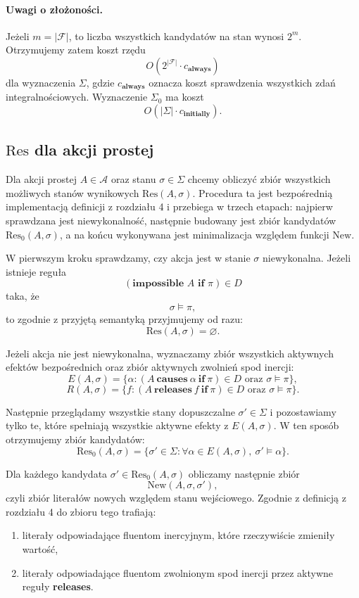 \documentclass[11pt,a4paper]{article}
\theoremstyle{definition}
\begin{document}
\paragraph{Uwagi o złożoności.}
Jeżeli $m = |\mathcal{F}|$, to liczba wszystkich kandydatów na stan wynosi $2^m$. Otrzymujemy zatem koszt rzędu
\[
O(2^{|\mathcal{F}|} \cdot c_{\textbf{always}})
\]
dla wyznaczenia $\Sigma$, gdzie $c_{\textbf{always}}$ oznacza koszt sprawdzenia wszystkich zdań integralnościowych. Wyznaczenie $\Sigma_0$ ma koszt
\[
O(|\Sigma| \cdot c_{\textbf{initially}}).
\]

\subsection{\texorpdfstring{$\mathrm{Res}$}{Res} dla akcji prostej}

Dla akcji prostej $A \in \mathcal{A}$ oraz stanu $\sigma \in \Sigma$ chcemy obliczyć zbiór wszystkich możliwych stanów wynikowych $\mathrm{Res}(A,\sigma)$. Procedura ta jest bezpośrednią implementacją definicji z rozdziału 4 i przebiega w trzech etapach: najpierw sprawdzana jest niewykonalność, następnie budowany jest zbiór kandydatów $\mathrm{Res}_0(A,\sigma)$, a na końcu wykonywana jest minimalizacja względem funkcji $\mathrm{New}$.

W pierwszym kroku sprawdzamy, czy akcja jest w stanie $\sigma$ niewykonalna. Jeżeli istnieje reguła
\[
(\textbf{impossible } A \textbf{ if } \pi)\in D
\]
taka, że
\[
\sigma \models \pi,
\]
to zgodnie z przyjętą semantyką przyjmujemy od razu:
\[
\mathrm{Res}(A,\sigma)=\varnothing.
\]

Jeżeli akcja nie jest niewykonalna, wyznaczamy zbiór wszystkich aktywnych efektów bezpośrednich oraz zbiór aktywnych zwolnień spod inercji:
\[
E(A,\sigma)=\{\alpha : (A \ \textbf{causes} \ \alpha \ \textbf{if} \ \pi)\in D \text{ oraz } \sigma \models \pi\},
\]
\[
R(A,\sigma)=\{f : (A \ \textbf{releases} \ f \ \textbf{if} \ \pi)\in D \text{ oraz } \sigma \models \pi\}.
\]

Następnie przeglądamy wszystkie stany dopuszczalne $\sigma' \in \Sigma$ i pozostawiamy tylko te, które spełniają wszystkie aktywne efekty z $E(A,\sigma)$. W ten sposób otrzymujemy zbiór kandydatów:
\[
\mathrm{Res}_0(A,\sigma)=\{\sigma' \in \Sigma : \forall \alpha \in E(A,\sigma),\ \sigma' \models \alpha\}.
\]

Dla każdego kandydata $\sigma' \in \mathrm{Res}_0(A,\sigma)$ obliczamy następnie zbiór
\[
\mathrm{New}(A,\sigma,\sigma'),
\]
czyli zbiór literałów nowych względem stanu wejściowego. Zgodnie z definicją z rozdziału 4 do zbioru tego trafiają:
\begin{enumerate}
    \item literały odpowiadające fluentom inercyjnym, które rzeczywiście zmieniły wartość,
    \item literały odpowiadające fluentom zwolnionym spod inercji przez aktywne reguły \textbf{releases}.
\end{enumerate}
\end{document}
